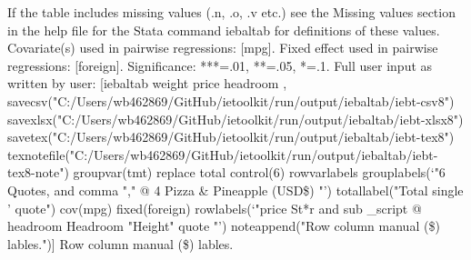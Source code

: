 If the table includes missing values (.n, .o, .v etc.) see the Missing values section in the help file for the Stata command iebaltab for definitions of these values. Covariate(s) used in pairwise regressions: [mpg]. Fixed effect used in pairwise regressions: [foreign]. Significance: ***=.01, **=.05, *=.1. Full user input as written by user: [iebaltab weight price headroom , savecsv("C:/Users/wb462869/GitHub/ietoolkit/run/output/iebaltab/iebt-csv8") savexlsx("C:/Users/wb462869/GitHub/ietoolkit/run/output/iebaltab/iebt-xlsx8") savetex("C:/Users/wb462869/GitHub/ietoolkit/run/output/iebaltab/iebt-tex8") texnotefile("C:/Users/wb462869/GitHub/ietoolkit/run/output/iebaltab/iebt-tex8-note") groupvar(tmt) replace total control(6) rowvarlabels grouplabels(`"6 Quotes, and comma "," @ 4 Pizza \& Pineapple (USD\$) "') totallabel("Total single ' quote") cov(mpg) fixed(foreign) rowlabels(`"price St*r and sub \_script @ headroom Headroom "Height" quote "') noteappend("Row column manual (\$) lables.")] Row column manual (\$) lables.
